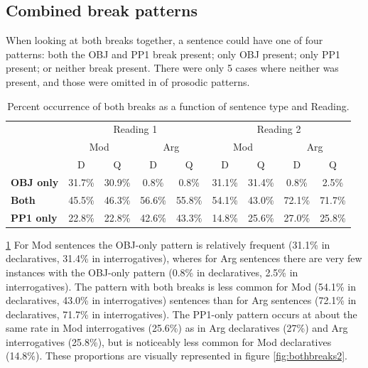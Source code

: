 \documentclass[12pt,oneside]{book}
\begin{document}
\hypertarget{bbr}{%
\subsection{Combined break patterns}\label{bbr}}

When looking at both breaks together, a sentence could have one of four patterns: both the OBJ and PP1 break present; only OBJ present; only PP1 present; or neither break present. There were only 5 cases where neither was present, and those were omitted in  of prosodic patterns.

\begin{table}[!h]

\caption{\label{tab:bothbreaks}Percent occurrence of both breaks as a function of sentence type and Reading.}
\centering
\begin{tabular}{>{\bfseries}lcccccccc}
\toprule
\multicolumn{1}{c}{ } & \multicolumn{4}{c}{Reading 1} & \multicolumn{4}{c}{Reading 2} \\
\cmidrule(l{3pt}r{3pt}){2-5} \cmidrule(l{3pt}r{3pt}){6-9}
\multicolumn{1}{c}{ } & \multicolumn{2}{c}{Mod} & \multicolumn{2}{c}{Arg} & \multicolumn{2}{c}{Mod} & \multicolumn{2}{c}{Arg} \\
\cmidrule(l{3pt}r{3pt}){2-3} \cmidrule(l{3pt}r{3pt}){4-5} \cmidrule(l{3pt}r{3pt}){6-7} \cmidrule(l{3pt}r{3pt}){8-9}
  & D & Q & D & Q & D & Q & D & Q\\
\midrule
OBJ only & 31.7\% & 30.9\% & 0.8\% & 0.8\% & 31.1\% & 31.4\% & 0.8\% & 2.5\%\\
Both & 45.5\% & 46.3\% & 56.6\% & 55.8\% & 54.1\% & 43.0\% & 72.1\% & 71.7\%\\
PP1 only & 22.8\% & 22.8\% & 42.6\% & 43.3\% & 14.8\% & 25.6\% & 27.0\% & 25.8\%\\
\bottomrule
\end{tabular}
\end{table}

 \ref{tab:bothbreaks}   For Mod sentences the OBJ-only pattern is relatively frequent (31.1\% in declaratives, 31.4\% in interrogatives), wheres for Arg sentences there are very few instances with the OBJ-only pattern (0.8\% in declaratives, 2.5\% in interrogatives). The pattern with both breaks is less common for Mod (54.1\% in declaratives, 43.0\% in interrogatives) sentences than for Arg sentences (72.1\% in declaratives, 71.7\% in interrogatives). The PP1-only pattern occurs at about the same rate in Mod interrogatives (25.6\%) as in Arg declaratives (27\%) and Arg interrogatives (25.8\%), but is noticeably less common for Mod declaratives (14.8\%). These proportions are visually represented in figure \ref{fig:bothbreaks2}.
\end{document}
